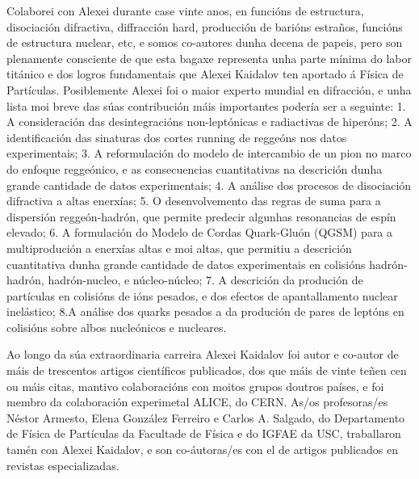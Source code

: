 \begin{refsection}
\begin{multicols}{2}
Colaborei con Alexei durante case vinte anos, en funcións de estructura, disociación difractiva, diffracción hard, producción de barións estraños, funcións de estructura nuclear, etc, e somos co-autores dunha decena de papeis, pero son plenamente consciente de que esta bagaxe representa unha parte mínima do labor titánico e dos logros fundamentais que Alexei Kaidalov ten aportado á Física de Partículas. Posiblemente Alexei foi o maior experto mundial en difracción, e unha lista moi breve das súas contribución máis importantes podería ser a seguinte: 1. A consideración das desintegracións non-leptónicas e radiactivas de hiperóns; 2. A identificación das sinaturas dos cortes running de reggeóns nos datos experimentais; 3. A reformulación do modelo de intercambio de un pion no marco do enfoque reggeónico, e as consecuencias cuantitativas na descrición dunha grande cantidade de datos experimentais; 4. A análise dos procesos de disociación difractiva a altas enerxías; 5. O desenvolvemento das regras de suma para a dispersión reggeón-hadrón, que permite predecir algunhas resonancias de espín elevado; 6. A formulación do Modelo de Cordas Quark-Gluón (QGSM) para a multiprodución a enerxías altas e moi altas, que permitiu a descrición cuantitativa dunha grande cantidade de datos experimentais en colisións hadrón-hadrón, hadrón-nucleo, e núcleo-núcleo; 7. A descrición da produción de partículas en colisións de ións pesados, e dos efectos de apantallamento nuclear inelástico; 8.A análise dos quarks pesados a da produción de pares de leptóns en colisións sobre albos nucleónicos e nucleares.

Ao longo da súa extraordinaria carreira Alexei Kaidalov foi autor e co-autor de máis de trescentos artigos científicos publicados, dos que máis de vinte teñen cen ou máis citas, mantivo colaboracións con moitos grupos doutros países, e foi membro da colaboración experimetal ALICE, do CERN. As/os profesoras/es Néstor Armesto, Elena González Ferreiro e Carlos A. Salgado, do Departamento de Física de Partículas da Facultade de Física e do IGFAE da USC, traballaron tamén con Alexei Kaidalov, e son co-áutoras/es con el de artigos publicados en revistas especializadas.


\end{multicols}
\end{refsection}
